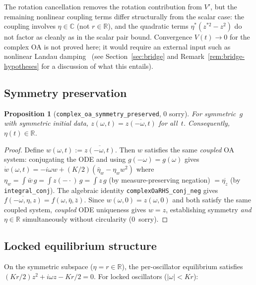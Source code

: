 \documentclass[11pt,a4paper]{article}
\newtheorem{proposition}[theorem]{Proposition}
\theoremstyle{definition}
\newcommand{\R}{\mathbb{R}}
\newcommand{\C}{\mathbb{C}}
\begin{document}
The rotation cancellation removes the rotation contribution from $V'$, but the remaining nonlinear coupling terms differ structurally from the scalar case: the coupling involves $\eta \in \C$ (not $r \in \R$), and the quadratic terms $\eta^*(z^{*2} - z^2)$ do not factor as cleanly as in the scalar pair bound. Convergence $V(t) \to 0$ for the complex OA is not proved here; it would require an external input such as nonlinear Landau damping~\cite{dietert2017} (see Section~\ref{sec:bridge} and Remark~\ref{rem:bridge-hypotheses} for a discussion of what this entails).

\subsection{Symmetry preservation}

\begin{proposition}[\texttt{complex\_oa\_symmetry\_preserved}, 0 sorry]
For symmetric~$g$ with symmetric initial data, $z(\omega,t) = \overline{z(-\omega,t)}$ for all~$t$. Consequently, $\eta(t) \in \R$.
\end{proposition}
\begin{proof}
Define $w(\omega,t) := \overline{z(-\omega,t)}$. Then $w$ satisfies the same \emph{coupled} OA system: conjugating the ODE and using $g(-\omega) = g(\omega)$ gives $\dot w(\omega,t) = -i\omega w + (K/2)(\bar\eta_w - \eta_w w^2)$ where $\eta_w = \int \bar w\,g = \int z(-\cdot)\,g = \int z\,g$ (by measure-preserving negation) $= \overline{\eta_z}$ (by \texttt{integral\_conj}). The algebraic identity \texttt{complexOaRHS\_conj\_neg} gives $\overline{f(-\omega,\eta,z)} = f(\omega,\bar\eta,\bar z)$. Since $w(\omega,0) = z(\omega,0)$ and both satisfy the same coupled system, \emph{coupled} ODE uniqueness gives $w = z$, establishing symmetry \emph{and} $\eta \in \R$ simultaneously without circularity (0~sorry).
\end{proof}

\subsection{Locked equilibrium structure}

On the symmetric subspace ($\eta = r \in \R$), the per-oscillator equilibrium satisfies $(Kr/2)z^2 + i\omega z - Kr/2 = 0$. For locked oscillators ($|\omega| < Kr$):
\end{document}
